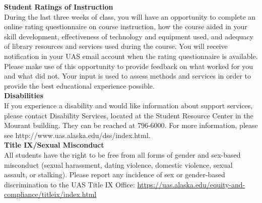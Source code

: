 \documentclass[11pt,letterpaper]{article}
\begin{document}

\textbf{Student Ratings of Instruction}\\
During the last three weeks of class, you will have an opportunity to complete an online rating questionnaire on course instruction, how the course aided in your skill development,  effectiveness of technology and equipment used, and adequacy of library resources and services used during the course. You will receive notification in your UAS email account when the rating questionnaire is available. Please make use of this opportunity to provide feedback on what worked for you and what did not. Your input is used to assess methods and services in order to provide the best educational experience possible.\\

\textbf{Disabilities}\\
If you experience a disability and would like information about support services, please contact Disability Services, located at the Student Resource Center in the Mourant building.  They can be reached at 796-6000. For more information, please see http://www.uas.alaska.edu/dss/index.html.\\

\textbf{Title IX/Sexual Misconduct}\\
All students have the right to be free from all forms of gender and sex-based misconduct (sexual harassment, dating violence, domestic violence, sexual assault, or stalking). Please report any incidence of sex or gender-based discrimination to the UAS Title IX Office: \url{https://uas.alaska.edu/equity-and-compliance/titleix/index.html}
\end{document}
